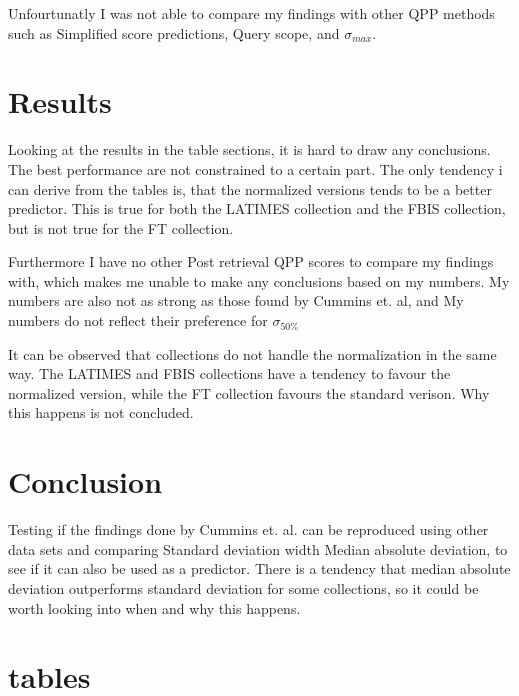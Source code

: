 \documentclass{sig-alternate}
\begin{document}
Unfourtunatly I was not able to compare my findings with other QPP methods such as Simplified score predictions, Query scope, and $\sigma_{max}$. 
\section{Results}
Looking at the results in the table sections, it is hard to draw any conclusions. The best performance are not constrained to a certain part. The only tendency i can derive from the tables is, that the normalized versions tends to be a better predictor. This is true for both the LATIMES collection and the FBIS collection, but is not true for the FT collection.

Furthermore I have no other Post retrieval QPP scores to compare my findings with, which makes me unable to make any conclusions based on my numbers. My numbers are also not as strong as those found by Cummins et. al, and My numbers do not reflect their preference for $\sigma_{50\%}$

It can be observed that collections do not handle the normalization in the same way. The LATIMES and FBIS collections have a tendency to favour the normalized version, while the FT collection favours the standard verison. Why this happens is not concluded.

\section{Conclusion}
Testing if the findings done by Cummins et. al.\cite{cummins2011improved} can be reproduced using other data sets and comparing Standard deviation width Median absolute deviation, to see if it can also be used as a predictor. There is a tendency that median absolute deviation outperforms standard deviation for some collections, so it could be worth looking into when and why this happens.


%
\onecolumn
\section{tables}
\end{document}
